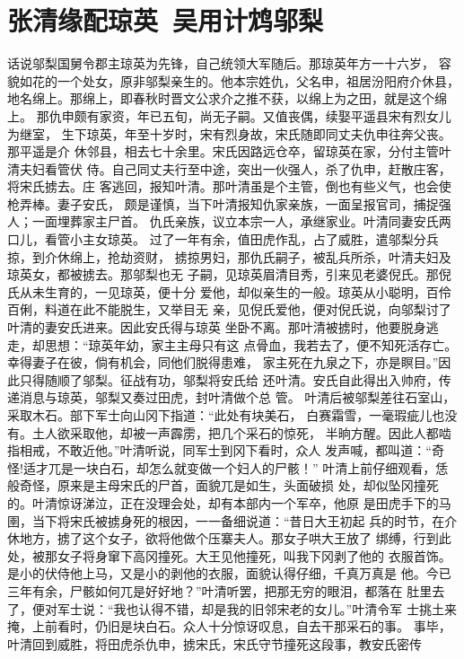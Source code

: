 \chapter{张清缘配琼英~吴用计鸩邬梨}

话说邬梨国舅令郡主琼英为先锋，自己统领大军随后。那琼英年方一十六岁，
容貌如花的一个处女，原非邬梨亲生的。他本宗姓仇，父名申，祖居汾阳府介休县，
地名绵上。那绵上，即春秋时晋文公求介之推不获，以绵上为之田，就是这个绵上。
那仇申颇有家资，年已五旬，尚无子嗣。又值丧偶，续娶平遥县宋有烈女儿为继室，
生下琼英，年至十岁时，宋有烈身故，宋氏随即同丈夫仇申往奔父丧。那平遥是介
休邻县，相去七十余里。宋氏因路远仓卒，留琼英在家，分付主管叶清夫妇看管伏
侍。自己同丈夫行至中途，突出一伙强人，杀了仇申，赶散庄客，将宋氏掳去。庄
客逃回，报知叶清。那叶清虽是个主管，倒也有些义气，也会使枪弄棒。妻子安氏，
颇是谨慎，当下叶清报知仇家亲族，一面呈报官司，捕捉强人；一面埋葬家主尸首。
仇氏亲族，议立本宗一人，承继家业。叶清同妻安氏两口儿，看管小主女琼英。
过了一年有余，值田虎作乱，占了威胜，遣邬梨分兵掠，到介休绵上，抢劫资财，
掳掠男妇，那仇氏嗣子，被乱兵所杀，叶清夫妇及琼英女，都被掳去。那邬梨也无
子嗣，见琼英眉清目秀，引来见老婆倪氏。那倪氏从未生育的，一见琼英，便十分
爱他，却似亲生的一般。琼英从小聪明，百伶百俐，料道在此不能脱生，又举目无
亲，见倪氏爱他，便对倪氏说，向邬梨讨了叶清的妻安氏进来。因此安氏得与琼英
坐卧不离。那叶清被掳时，他要脱身逃走，却思想：“琼英年幼，家主主母只有这
点骨血，我若去了，便不知死活存亡。幸得妻子在彼，倘有机会，同他们脱得患难，
家主死在九泉之下，亦是瞑目。”因此只得随顺了邬梨。征战有功，邬梨将安氏给
还叶清。安氏自此得出入帅府，传递消息与琼英，邬梨又奏过田虎，封叶清做个总
管。
叶清后被邬梨差往石室山，采取木石。部下军士向山冈下指道：“此处有块美石，
白赛霜雪，一毫瑕疵儿也没有。土人欲采取他，却被一声霹雳，把几个采石的惊死，
半晌方醒。因此人都啮指相戒，不敢近他。”叶清听说，同军士到冈下看时，众人
发声喊，都叫道：“奇怪!适才兀是一块白石，却怎么就变做一个妇人的尸骸！”
叶清上前仔细观看，恁般奇怪，原来是主母宋氏的尸首，面貌兀是如生，头面破损
处，却似坠冈撞死的。叶清惊讶涕泣，正在没理会处，却有本部内一个军卒，他原
是田虎手下的马圉，当下将宋氏被掳身死的根因，一一备细说道：“昔日大王初起
兵的时节，在介休地方，掳了这个女子，欲将他做个压寨夫人。那女子哄大王放了
绑缚，行到此处，被那女子将身窜下高冈撞死。大王见他撞死，叫我下冈剥了他的
衣服首饰。是小的伏侍他上马，又是小的剥他的衣服，面貌认得仔细，千真万真是
他。今已三年有余，尸骸如何兀是好好地？”叶清听罢，把那无穷的眼泪，都落在
肚里去了，便对军士说：“我也认得不错，却是我的旧邻宋老的女儿。”叶清令军
士挑土来掩，上前看时，仍旧是块白石。众人十分惊讶叹息，自去干那采石的事。
事毕，叶清回到威胜，将田虎杀仇申，掳宋氏，宋氏守节撞死这段事，教安氏密传
